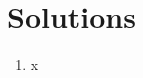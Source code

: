 \documentclass{article}
\begin{document}


\raggedright

\section*{Solutions}
\begin{enumerate}
    \item x
\end{enumerate}
\end{document}
